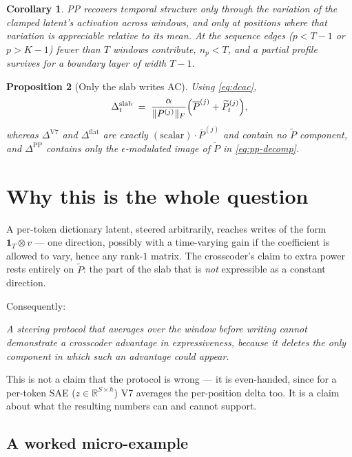 \documentclass[11pt]{article}
\newtheorem{proposition}{Proposition}
\newtheorem{corollary}[proposition]{Corollary}
\theoremstyle{definition}
\newcommand{\Rbb}{\mathbb{R}}
\newcommand{\one}{\mathbf{1}}
\newcommand{\slab}{P}
\newcommand{\dc}{\overline{\slab}}
\newcommand{\ac}{\widetilde{\slab}}
\begin{document}
\begin{corollary}
PP recovers temporal structure only through the \emph{variation of the clamped latent's
activation across windows}, and only at positions where that variation is appreciable relative to
its mean. At the sequence edges ($p<T-1$ or $p>K-1$) fewer than $T$ windows contribute, $n_p<T$,
and a partial profile survives for a boundary layer of width $T-1$.
\end{corollary}

\begin{proposition}[Only the slab writes AC]
Using \eqref{eq:dcac},
\[
  \Delta^{\mathrm{slab}}_t \;=\; \frac{\alpha}{\lVert \slab^{(j)}\rVert_F}
  \Bigl(\dc^{(j)} + \ac^{(j)}_t\Bigr),
\]
whereas $\Delta^{\mathrm{V7}}$ and $\Delta^{\mathrm{flat}}$ are exactly
$(\text{scalar})\cdot\dc^{(j)}$ and contain no $\ac$ component, and $\Delta^{\mathrm{PP}}$
contains only the $\epsilon$-modulated image of $\ac$ in \eqref{eq:pp-decomp}.
\end{proposition}

\section{Why this is the whole question}

A per-token dictionary latent, steered arbitrarily, reaches writes of the form
$\one_T \otimes v$ --- one direction, possibly with a time-varying gain if the coefficient is
allowed to vary, hence any rank-$1$ matrix. The crosscoder's claim to extra power rests entirely
on $\ac$: the part of the slab that is \emph{not} expressible as a constant direction.

Consequently:
\begin{center}
\emph{A steering protocol that averages over the window before writing cannot demonstrate a
crosscoder advantage in expressiveness, because it deletes the only component in which such an
advantage could appear.}
\end{center}
This is not a claim that the protocol is wrong --- it is even-handed, since for a per-token SAE
($z\in\Rbb^{S\times h}$) V7 averages the per-position delta too. It is a claim about what the
resulting numbers can and cannot support.

\subsection{A worked micro-example}
\end{document}
